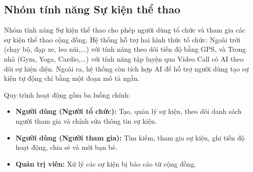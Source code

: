 \subsection{Nhóm tính năng Sự kiện thể thao}
\label{subsec:impl_sport_event}

Nhóm tính năng Sự kiện thể thao cho phép người dùng tổ chức và tham gia các sự kiện thể thao cộng đồng. Hệ thống hỗ trợ hai hình thức tổ chức: Ngoài trời (chạy bộ, đạp xe, leo núi,...) với tính năng theo dõi tiến độ bằng GPS, và Trong nhà (Gym, Yoga, Cardio,...) với tính năng tập luyện qua Video Call có AI theo dõi sự hiện diện. Ngoài ra, hệ thống còn tích hợp AI để hỗ trợ người dùng tạo sự kiện tự động chỉ bằng một đoạn mô tả ngắn.

Quy trình hoạt động gồm ba luồng chính:
\begin{itemize}
    \item \textbf{Người dùng (Người tổ chức):} Tạo, quản lý sự kiện, theo dõi danh sách người tham gia và chỉnh sửa thông tin sự kiện.
    \item \textbf{Người dùng (Người tham gia):} Tìm kiếm, tham gia sự kiện, ghi tiến độ hoạt động, chia sẻ và mời bạn bè.
    \item \textbf{Quản trị viên:} Xử lý các sự kiện bị báo cáo từ cộng đồng.
\end{itemize}

